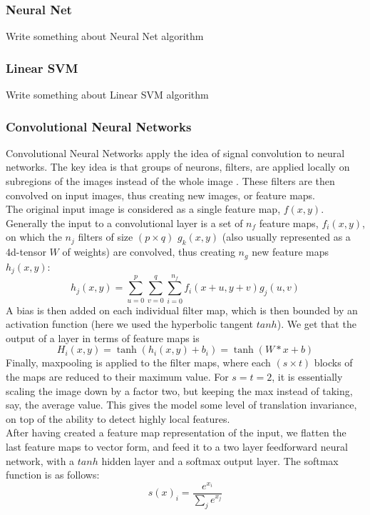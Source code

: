 \documentclass{acm_proc_article-sp}
\begin{document}
\subsubsection{Neural Net}
Write something about Neural Net algorithm

\subsubsection{Linear SVM }
Write something about Linear SVM algorithm

\subsubsection{Convolutional Neural Networks}
Convolutional Neural Networks apply the idea of signal convolution to neural networks. The key idea is that groups of neurons, filters, are applied locally on subregions of the images instead of the whole image \cite{726791}. These filters are then convolved on input images, thus creating new images, or feature maps.\\
The original input image is considered as a single feature map, $f(x,y)$. Generally the input to a convolutional layer is a set of $n_f$ feature maps, $f_i(x,y)$, on which the $n_j$ filters of size $(p\times q)$ $g_k(x,y)$ (also usually represented as a 4d-tensor $W$ of weights) are convolved, thus creating $n_g$ new feature maps $h_j(x,y)$:
$$ h_j(x,y) = \sum_{u=0}^p\sum_{v=0}^q\sum_{i=0}^{n_f} f_i(x+u,y+v)g_j(u,v) $$
A bias is then added on each individual filter map, which is then bounded by an activation function (here we used the hyperbolic tangent $tanh$). We get that the output of a layer in terms of feature maps is 
$$H_i(x,y) = \tanh(h_i(x,y) + b_i) = \tanh(W\ast x + b) $$
Finally, maxpooling is applied to the filter maps, where each $(s \times t)$ blocks of the maps are reduced to their maximum value. For $s=t=2$, it is essentially scaling the image down by a factor two, but keeping the max instead of taking, say, the average value. This gives the model some level of translation invariance, on top of the ability to detect highly local features.\\
After having created a feature map representation of the input, we flatten the last feature maps to vector form, and feed it to a two layer feedforward neural network, with a $tanh$ hidden layer and a softmax output layer. The softmax function is as follows:
$$ s(x)_i = \frac{e^{x_i}}{\sum_j e^{x_j}} $$
\end{document}
